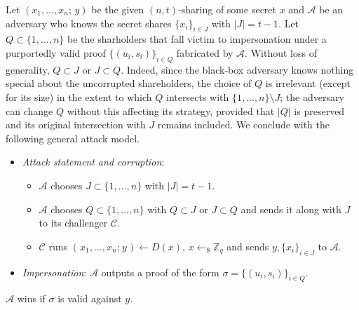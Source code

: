 \documentclass{iacrtrans}
\begin{document}
Let $(x_1, \dots, x_n;\hspace{2pt} y)$
be the given $(n, t)$-sharing of some secret $x$
and $\mathcal{A}$ be an adversary who knows
the secret shares
$\{x_i\}_{i \in J}$ with $|J| = t-1$.
Let $Q \subset \{1, \dots, n\}$ be the
sharholders that fall victim to impersonation
under a purportedly valid proof $\{(u_i, s_i)\}_{i \in Q}$
fabricated by $\mathcal{A}$.
Without loss of generality,
$Q \subset J$ or $J \subset Q$.
Indeed, since the black-box adversary knows nothing
special about the uncorrupted shareholders,
the choice of $Q$ is irrelevant
(except for its size) in the extent to which
$Q$ intersects with $\{1, \dots, n\} \setminus J$;
the adversary can change $Q$
without this affecting its strategy,
provided that $|Q|$ is preserved and
its original intersection with $J$ remains included.
We conclude with the following general attack model.
\begin{itemize}[label=$\bullet$,leftmargin=20pt,rightmargin=0pt]
	\vspace{4pt}
	\item
		\textit{Attack statement and corruption}:
			\begin{itemize}[
				label=$\circ$,leftmargin=17pt,rightmargin=21pt
			]
			\vspace{3pt}
			\item $\mathcal{A}$ chooses $J \subset \{1, \dots, n\}$
				with $|J| = t-1$.
				\vspace{3pt}
			\item $\mathcal{A}$ chooses $Q \subset \{1, \dots, n\}$
				with $Q \subset J$  or $J \subset Q$ and
				sends it along with $J$ to its challenger
				$\mathcal{C}$.
				\vspace{3pt}
			\item $\mathcal{C}$ runs
				$(\hspace{1pt}x_1, \dots, x_n;\hspace{1pt} y\hspace{1pt})
				\leftarrow D(x),\hspace{2pt} x \leftarrow_\$ \mathbb{Z}_q$
				and sends $y, \{x_i\}_{i \in J}$
				to $\mathcal{A}$.
			\vspace{3pt}
			\end{itemize}
	\item \textit{Impersonation}:
		$\mathcal{A}$ outputs a proof of the form
		$\sigma = \{(u_i, s_i)\}_{i \in Q}$.
\vspace{5pt}
\end{itemize}
\hspace*{5pt}%
\begin{minipage}{\dimexpr\textwidth-\parindent\relax}%
\hspace{0pt}
$\mathcal{A}$ wins if $\sigma$ is valid against $y$.
\vspace{5pt}
\end{minipage}%
\end{document}
